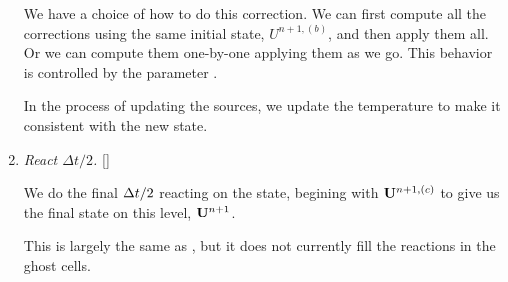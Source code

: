 \begin{enumerate}
  We have a choice of how to do this correction.  We can first compute
  all the corrections using the same initial state, $U^{n+1,(b)}$,
  and then apply them all.  Or we can compute them one-by-one applying
  them as we go.  This behavior is controlled by the parameter
  .

  In the process of updating the sources, we update the temperature to
  make it consistent with the new state.






\item {\em React $\Delta t/2$.} []

  We do the final $\Delta t/2$ reacting on the state, begining with ${\bf U}^{n+1,(c)}$ to
  give us the final state on this level, ${\bf U}^{n+1}$.

  This is largely the same as , but
  it does not currently fill the reactions in the ghost cells. 


\end{enumerate}
